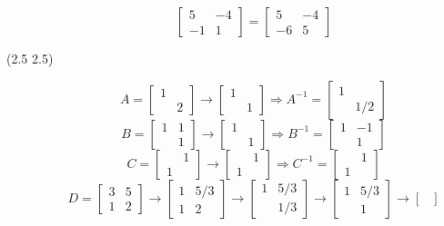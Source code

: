 \begin{description}
$$\begin{bmatrix}
5 & -4 \\
-1 & 1
\end{bmatrix} = \begin{bmatrix}
5 & -4 \\
-6 & 5
\end{bmatrix}$$
\item[(2.5 {\color{cBlue}2.5})]
$$A = \begin{bmatrix}
1 & \\
& 2
\end{bmatrix} \rightarrow \begin{bmatrix}
1 & \\
& 1
\end{bmatrix} \Rightarrow A^{-1} = \begin{bmatrix}
1 & \\
& 1/2
\end{bmatrix} $$
$$B = \begin{bmatrix}
1 & 1 \\
& 1
\end{bmatrix} \rightarrow \begin{bmatrix}
1 & \\
& 1
\end{bmatrix} \Rightarrow B^{-1} = \begin{bmatrix}
1 & -1 \\
& 1
\end{bmatrix}$$
$$C = \begin{bmatrix}
& 1 \\
1 &
\end{bmatrix} \rightarrow \begin{bmatrix}
& 1 \\
1 &
\end{bmatrix} \Rightarrow C^{-1} = \begin{bmatrix}
& 1 \\
1 &
\end{bmatrix}$$
$$D = \begin{bmatrix}
3 & 5 \\
1 & 2
\end{bmatrix} \rightarrow \begin{bmatrix}
1 & 5/3 \\
1 & 2
\end{bmatrix} \rightarrow \begin{bmatrix}
1 & 5/3 \\
& 1/3
\end{bmatrix} \rightarrow \begin{bmatrix}
1 & 5/3 \\
& 1
\end{bmatrix} \rightarrow \begin{bmatrix}

\end{bmatrix}$$
\end{description}
